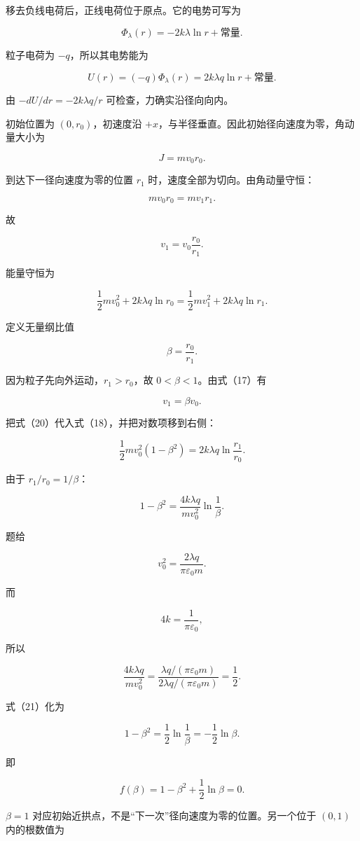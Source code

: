 \documentclass[12pt,a4paper,UTF8]{ctexart}
\begin{document}
移去负线电荷后，正线电荷位于原点。它的电势可写为

\[
\Phi_\lambda(r)=-2k\lambda\ln r+\text{常量}.
\]

粒子电荷为 \(-q\)，所以其电势能为

\[
U(r)=(-q)\Phi_\lambda(r)
=2k\lambda q\ln r+\text{常量}. \tag{15}
\]

由 \(-dU/dr=-2k\lambda q/r\) 可检查，力确实沿径向向内。

初始位置为 \((0,r_0)\)，初速度沿
\(+x\)，与半径垂直。因此初始径向速度为零，角动量大小为

\[
J=mv_0r_0. \tag{16}
\]

到达下一径向速度为零的位置 \(r_1\) 时，速度全部为切向。由角动量守恒：

\[
mv_0r_0=mv_1r_1.
\]

故

\[
v_1=v_0\frac{r_0}{r_1}. \tag{17}
\]

能量守恒为

\[
\frac12mv_0^2+2k\lambda q\ln r_0
=\frac12mv_1^2+2k\lambda q\ln r_1. \tag{18}
\]

定义无量纲比值

\[
\beta=\frac{r_0}{r_1}. \tag{19}
\]

因为粒子先向外运动，\(r_1>r_0\)，故 \(0<\beta<1\)。由式（17）有

\[
v_1=\beta v_0. \tag{20}
\]

把式（20）代入式（18），并把对数项移到右侧：

\[
\frac12mv_0^2(1-\beta^2)
=2k\lambda q\ln\frac{r_1}{r_0}.
\]

由于 \(r_1/r_0=1/\beta\)：

\[
1-\beta^2
=\frac{4k\lambda q}{mv_0^2}\ln\frac1\beta. \tag{21}
\]

题给

\[
v_0^2=\frac{2\lambda q}{\pi\varepsilon_0m}.
\]

而

\[
4k=\frac1{\pi\varepsilon_0},
\]

所以

\[
\frac{4k\lambda q}{mv_0^2}
=\frac{\lambda q/(\pi\varepsilon_0m)}
{2\lambda q/(\pi\varepsilon_0m)}
=\frac12. \tag{22}
\]

式（21）化为

\[
1-\beta^2
=\frac12\ln\frac1\beta
=-\frac12\ln\beta. \tag{23}
\]

即

\[
f(\beta)=1-\beta^2+\frac12\ln\beta=0. \tag{24}
\]

\(\beta=1\) 对应初始近拱点，不是``下一次''径向速度为零的位置。另一个位于
\((0,1)\) 内的根数值为
\end{document}
